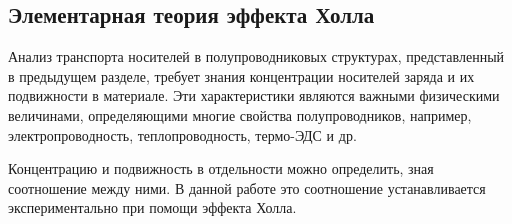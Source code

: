 

\subsection{Элементарная теория эффекта Холла}
Анализ транспорта носителей в полупроводниковых структурах, представленный в предыдущем разделе, требует знания концентрации носителей заряда и их подвижности в материале. Эти характеристики являются важными физическими величинами, определяющими многие свойства полупроводников, например, электропроводность, теплопроводность, термо-ЭДС и др.

Концентрацию и подвижность в отдельности можно определить, зная соотношение между ними. В данной работе это соотношение устанавливается экспериментально при помощи эффекта Холла.

